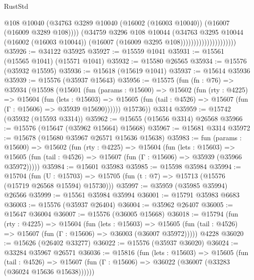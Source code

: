 \begin{lexlean}{RustStd}
\begin{coremodule}
                                        @108
                                        @10040
                                        (@34763
                                          @3289
                                          @10040
                                          (@16002 (@16003 @10040))
                                          (@16007 (@16009 @3289 @108))))
                                      (@34759
                                        @3296
                                        @108
                                        @10044
                                        (@34763
                                          @3295
                                          @10044
                                          (@16002 (@16003 @10044))
                                          (@16007 (@16009 @3295 @108)))))))))))))))))))))
@35926 := @34122 @35925
@35927 := @15559 @1041
@35931 := @15561 (@15565 @1041) (@15571 @1041)
@35932 := @15580 @26565
@35934 := @15576 (@35932 @15595)
@35936 := @15618 (@15619 @1041)
@35937 := @15614 @35936
@35939 := @15576 (@35937 @15643)
@35956 := @15575
    (fun (fn : @76) =>
    @35934
      (@15598
        (@15601
          (fun (params : @15600) =>
          @15602
            (fun (rty : @4225) =>
            @15604
              (fun (lets : @15603) =>
              @15605 (fun (tail : @4526) => @15607 (fun (Γ : @15606) => @35939 @15690))))))
        @15736))
    @3314
@35959 := @15742 (@35932 (@15593 @3314))
@35962 := @15655 (@15656 @3314) @26568
@35966 := @15576 (@15647 (@35962 @15664) @15668)
@35967 := @15681 @3314
@35972 := @15678 (@15680 @35967 @26571 @15636 @15638)
@35983 := fun (params : @15600) =>
  @15602
    (fun (rty : @4225) =>
    @15604
      (fun (lets : @15603) =>
      @15605 (fun (tail : @4526) => @15607 (fun (Γ : @15606) => @35939 (@35966 @35972)))))
@35984 := @15601 @35983
@35985 := @15598 @35984
@35994 := @15704
    (fun (U : @15703) => @15705 (fun (t : @7) => @15713 (@15576 (@15719 @26568 @15594) @15730)))
@35997 := @35959 (@35985 @35994) @26566
@35999 := @15561 @35984 @35994
@36001 := @15791 @35983 @6683
@36003 := @15576 (@35937 @26404)
@36004 := @35962 @26407
@36005 := @15647 @36004
@36007 := @15576 (@36005 @15668)
@36018 := @15794
    (fun (rty : @4225) =>
    @15604
      (fun (lets : @15603) =>
      @15605 (fun (tail : @4526) => @15607 (fun (Γ : @15606) => @36003 (@36007 @35972)))))
    @4228
@36020 := @15626 (@26402 @33277)
@36022 := @15576 (@35937 @36020)
@36024 := @33284 @35967 @26571
@36036 := @15816
    (fun (lets : @15603) =>
    @15605
      (fun (tail : @4526) =>
      @15607 (fun (Γ : @15606) => @36022 (@36007 (@33283 (@36024 @15636 @15638))))))

\end{coremodule}
\end{lexlean}
